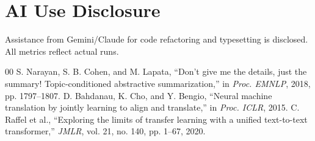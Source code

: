 \documentclass[conference]{IEEEtran}
\begin{document}
\section*{AI Use Disclosure}
Assistance from Gemini/Claude for code refactoring and typesetting is disclosed. All metrics reflect actual runs.

\begin{thebibliography}{00}
 S. Narayan, S. B. Cohen, and M. Lapata, ``Don't give me the details, just the summary! Topic-conditioned abstractive summarization,'' in \textit{Proc. EMNLP}, 2018, pp. 1797--1807.
 D. Bahdanau, K. Cho, and Y. Bengio, ``Neural machine translation by jointly learning to align and translate,'' in \textit{Proc. ICLR}, 2015.
 C. Raffel et al., ``Exploring the limits of transfer learning with a unified text-to-text transformer,'' \textit{JMLR}, vol. 21, no. 140, pp. 1--67, 2020.
\end{thebibliography}
\end{document}
